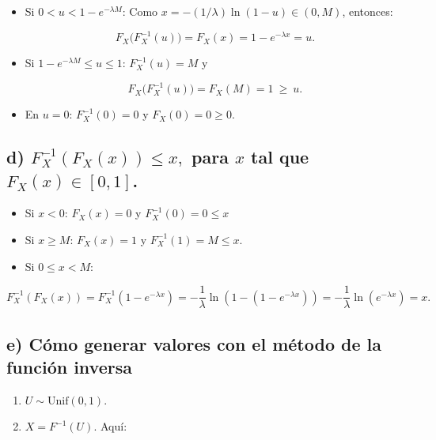 \documentclass[10pt,a4paper]{article}
\let\le\leqslant
\let\ge\geqslant
\let\leq\leqslant
\let\geq\geqslant
\providecommand{\tightlist}{%
      \setlength{\itemsep}{0pt}\setlength{\parskip}{0pt}}
\let\le\leq
\let\ge\geq
\begin{document}
    \begin{itemize}
\item
  Si \(0<u<1-e^{-\lambda M}\): Como \(x=-(1/\lambda)\ln(1-u)\in(0,M)\),
  entonces:

  \[
  F_X\big(F_X^{-1}(u)\big)=F_X(x)=1-e^{-\lambda x}=u.
  \]
\item
  Si \(1-e^{-\lambda M}\le u\le1\): \(F_X^{-1}(u)=M\) y

  \[
  F_X\big(F_X^{-1}(u)\big)=F_X(M)=1\ \ge\ u.
  \]
\item
  En \(u=0\): \(F_X^{-1}(0)=0\) y \(F_X(0)=0\ge 0\).
\end{itemize}

    \hypertarget{d-f-1_xf_xx-leq-x-para-x-tal-que-f_xx-in-0-1.}{%
\subsection{\texorpdfstring{d) \(F^{-1}_X(F_X(x)) \leq x,\) para \(x\)
tal que
\(F_X(x) \in [0, 1]\).}{d) F\^{}\{-1\}\_X(F\_X(x)) \textbackslash leq x, para x tal que F\_X(x) \textbackslash in {[}0, 1{]}.}}\label{d-f-1_xf_xx-leq-x-para-x-tal-que-f_xx-in-0-1.}}

    \begin{itemize}
\item
  Si \(x<0\): \(F_X(x)=0\) y \(F_X^{-1}(0)=0\le x\)
\item
  Si \(x\ge M\): \(F_X(x)=1\) y \(F_X^{-1}(1)=M\le x\).
\item
  Si \(0\le x < M\):
\end{itemize}

\[
F_X^{-1}(F_X(x))=F_X^{-1}\left(1-e^{-\lambda x}\right)= -\dfrac{1}{\lambda}\ln(1-\left(1-e^{-\lambda x}\right))= -\dfrac{1}{\lambda}\ln(e^{-\lambda x})=x.
\]

    \hypertarget{e-cuxf3mo-generar-valores-con-el-muxe9todo-de-la-funciuxf3n-inversa}{%
\subsection{e) Cómo generar valores con el método de la función
inversa}\label{e-cuxf3mo-generar-valores-con-el-muxe9todo-de-la-funciuxf3n-inversa}}

    \begin{enumerate}
\def\labelenumi{\arabic{enumi}.}
\tightlist
\item
  \(U\sim\mathrm{Unif}(0,1)\).
\item
  \(X=F^{-1}(U)\). Aquí:
\end{enumerate}
\end{document}

